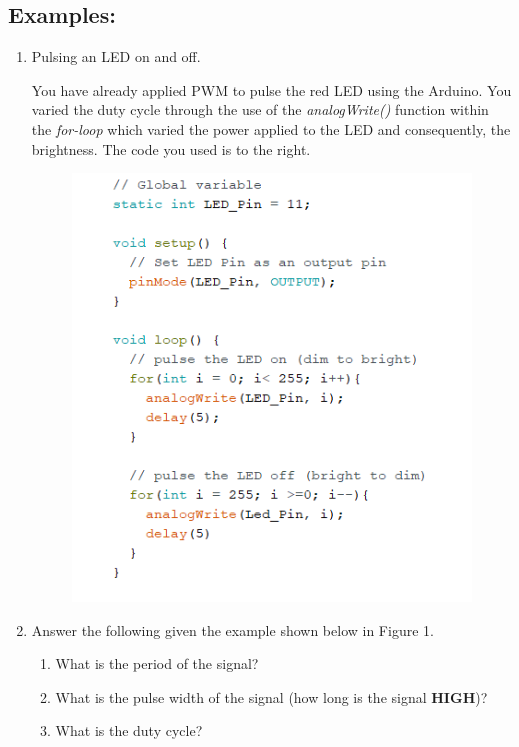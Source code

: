 \documentclass{handout}
\begin{document}
	\subsection{Examples:}
	\begin{enumerate}
		\item Pulsing an LED on and off.

	\begin{minipage}{.4\textwidth}
	You have already applied PWM to pulse the red LED using the Arduino. You varied the duty cycle through the use of the \mbox{\textit{analogWrite()}} function within the \textit{for-loop} which varied the power applied to the LED and consequently, the brightness. The code you used is to the right.
	\end{minipage}\hfill
	\begin{minipage}{.5\textwidth}
	\begin{figure} [H]
		\centering
		\includegraphics[width=\textwidth]{Figure2.PNG}
	\end{figure}
\end{minipage}

	\item Answer the following given the example shown below in Figure 1.
\begin{enumerate}
	\item What is the period of the signal?
	\item What is the pulse width of the signal (how long is the signal \textbf{HIGH})?
	\item What is the duty cycle?
\end{enumerate}


\end{enumerate}
\end{document}
